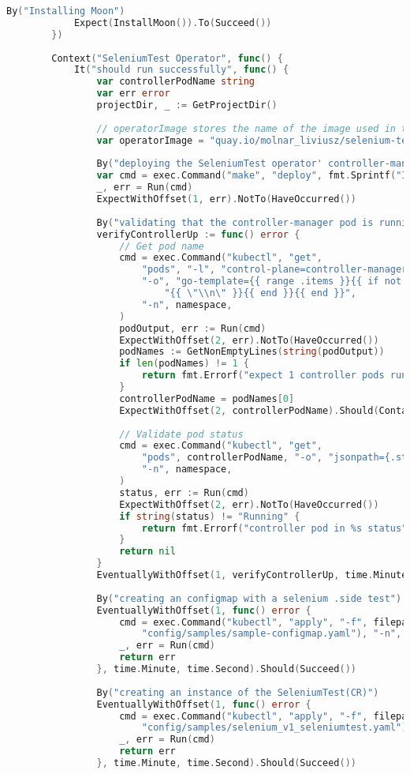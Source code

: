 \begin{lstlisting}[language={Go}]
			By("Installing Moon")
			Expect(InstallMoon()).To(Succeed())
		})
	
		Context("SeleniumTest Operator", func() {
			It("should run successfully", func() {
				var controllerPodName string
				var err error
				projectDir, _ := GetProjectDir()
	
				// operatorImage stores the name of the image used in the example
				var operatorImage = "quay.io/molnar_liviusz/selenium-test-operator:v0.0.24"
	
				By("deploying the SeleniumTest operator' controller-manager")
				var cmd = exec.Command("make", "deploy", fmt.Sprintf("IMG=%s", operatorImage))
				_, err = Run(cmd)
				ExpectWithOffset(1, err).NotTo(HaveOccurred())
	
				By("validating that the controller-manager pod is running as expected")
				verifyControllerUp := func() error {
					// Get pod name
					cmd = exec.Command("kubectl", "get",
						"pods", "-l", "control-plane=controller-manager",
						"-o", "go-template={{ range .items }}{{ if not .metadata.deletionTimestamp }}{{ .metadata.name }}"+
							"{{ \"\\n\" }}{{ end }}{{ end }}",
						"-n", namespace,
					)
					podOutput, err := Run(cmd)
					ExpectWithOffset(2, err).NotTo(HaveOccurred())
					podNames := GetNonEmptyLines(string(podOutput))
					if len(podNames) != 1 {
						return fmt.Errorf("expect 1 controller pods running, but got %d", len(podNames))
					}
					controllerPodName = podNames[0]
					ExpectWithOffset(2, controllerPodName).Should(ContainSubstring("controller-manager"))
	
					// Validate pod status
					cmd = exec.Command("kubectl", "get",
						"pods", controllerPodName, "-o", "jsonpath={.status.phase}",
						"-n", namespace,
					)
					status, err := Run(cmd)
					ExpectWithOffset(2, err).NotTo(HaveOccurred())
					if string(status) != "Running" {
						return fmt.Errorf("controller pod in %s status", status)
					}
					return nil
				}
				EventuallyWithOffset(1, verifyControllerUp, time.Minute, time.Second).Should(Succeed())
	
				By("creating an configmap with a selenium .side test")
				EventuallyWithOffset(1, func() error {
					cmd = exec.Command("kubectl", "apply", "-f", filepath.Join(projectDir,
						"config/samples/sample-configmap.yaml"), "-n", namespace)
					_, err = Run(cmd)
					return err
				}, time.Minute, time.Second).Should(Succeed())
	
				By("creating an instance of the SeleniumTest(CR)")
				EventuallyWithOffset(1, func() error {
					cmd = exec.Command("kubectl", "apply", "-f", filepath.Join(projectDir,
						"config/samples/selenium_v1_seleniumtest.yaml"), "-n", namespace)
					_, err = Run(cmd)
					return err
				}, time.Minute, time.Second).Should(Succeed())
	

\end{lstlisting}
